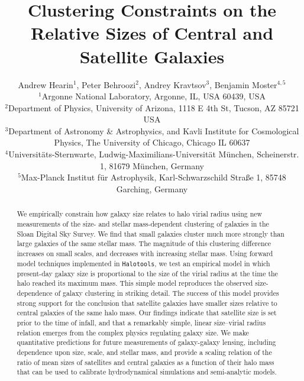 \documentclass[usenatbib,usegraphicx,letterpaper]{mn2e}
\begin{document}
\title[The Relative Sizes of Centrals and Satellites]
{Clustering Constraints on the Relative Sizes of Central and Satellite Galaxies}


\author[Hearin, Behroozi, Kravtsov \& Moster]{
Andrew Hearin$^{1}$, Peter Behroozi$^{2}$, Andrey Kravtsov$^{3}$, Benjamin Moster$^{4,5}$\\
$^{1}$Argonne National Laboratory, Argonne, IL, USA 60439, USA\\
$^{2}$Department of Physics, University of Arizona, 1118 E 4th St, Tucson, AZ 85721 USA\\
$^{3}$Department of Astronomy \& Astrophysics, and Kavli Institute for Cosmological Physics, The University of Chicago, Chicago IL 60637\\
$^{4}$Universit{\"a}ts-Sternwarte, Ludwig-Maximilians-Universit{\"a}t M{\"u}nchen, Scheinerstr. 1, 81679 M{\"u}nchen, Germany\\
$^5$Max-Planck Institut f\"ur Astrophysik, Karl-Schwarzschild Stra\ss e 1, 85748 Garching, Germany
}

\maketitle

\begin{abstract}
We empirically constrain how galaxy size relates to halo virial radius using new measurements of the size- and stellar mass-dependent clustering of galaxies in the Sloan Digital Sky Survey.  We find that small galaxies cluster much more strongly than large galaxies of the same stellar mass. 
The magnitude of this clustering difference increases on small scales, and decreases with increasing stellar mass. 
Using forward model techniques implemented in {\tt Halotools}, we test an empirical model in which present-day galaxy size is 
proportional to the size of the virial radius at the time the halo reached its maximum mass. This simple model reproduces the 
observed size-dependence of galaxy clustering in striking detail. 
The success of this model provides strong support for the conclusion that satellite galaxies have smaller sizes relative to central 
galaxies of the same halo mass. 
Our findings indicate that satellite size is set prior to the time of infall, and that a remarkably simple, linear size--virial radius relation 
emerges from the complex physics regulating galaxy size. 
We make quantitative predictions for future measurements of galaxy-galaxy lensing, including dependence upon size, scale, 
and stellar mass, and provide a scaling relation of the ratio of mean sizes of satellites and central galaxies as a function of their halo mass 
that can be used to calibrate hydrodynamical simulations and semi-analytic models. 
\end{abstract}
\end{document}
